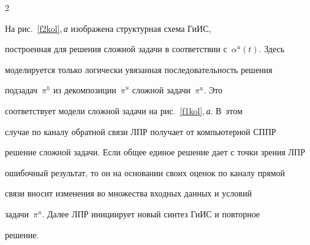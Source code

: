 \begin{multicols}{2}
\begin{figure}
\begin{center}
{}


\end{center}


\vspace*{-3pt}




\vspace*{9pt}


\end{figure}


  


  На рис.~\ref{f2kol},\,\textit{а} изображена структурная схема \mbox{ГиИС}, 


построенная для решения сложной задачи в соответствии с~$\alpha^u(t)$. Здесь 


моделируется только логически увязанная последовательность решения 


подзадач~$\pi^h$ из декомпозиции~$\dot{\pi}^u$ сложной задачи~$\pi^u$. Это 


соответствует модели сложной задачи на рис.~\ref{f1kol},\,\textit{а}. В~этом 


случае по каналу обратной связи ЛПР получает от компьютерной СППР 


решение сложной задачи. Если общее единое решение дает с точки зрения ЛПР 


ошибочный результат, то он на основании своих оценок по каналу прямой 


связи вносит изменения во множества входных данных и условий 


задачи~$\pi^u$. Далее ЛПР инициирует новый синтез ГиИС и повторное 


решение.



\end{multicols}
